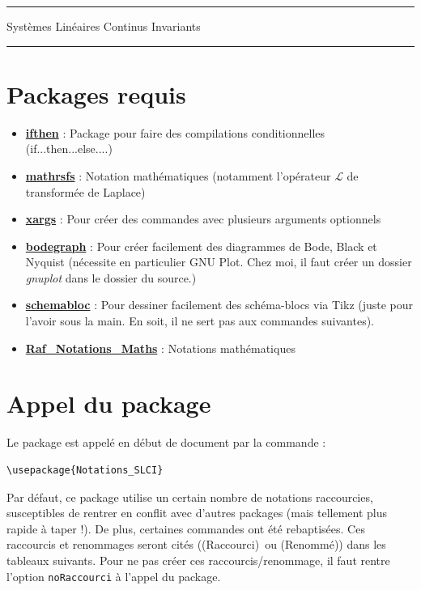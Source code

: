 \documentclass[a4paper,12pt]{article}
\newcommand{\rac}{({\color{red}Raccourci})}
\newcommand{\ren}{({\color{blue}Renommé})}
\begin{document}
	\begin{center}
		\hrule{\Large Systèmes Linéaires Continus Invariants}\\\hrule
	\end{center}


	\section{Packages requis}

		\begin{itemize}
			\item \href{http://www.ctan.org/pkg/ifthen}{\textbf{ifthen}} : Package pour faire des compilations conditionnelles (if...then...else....)
			\item \href{http://www.ctan.org/pkg/mathrsfs}{\textbf{mathrsfs}} : Notation mathématiques (notamment l'opérateur $\mathscr{L}$ de transformée de Laplace)
			\item \href{http://www.ctan.org/pkg/xargs}{\textbf{xargs}} : Pour créer des commandes avec plusieurs arguments optionnels
			\item \href{http://sciences-indus-cpge.papanicola.info/Bode-Black-et-Nyquist-avec-Tikz}{\textbf{bodegraph}} : Pour créer facilement des diagrammes de Bode, Black et Nyquist (nécessite en particulier GNU Plot. Chez moi, il faut créer un dossier \emph{gnuplot} dans le dossier du source.)
			\item \href{http://sciences-indus-cpge.papanicola.info/Schema-blocs-avec-PGF-TIKZ-sous}{\textbf{schemabloc}} : Pour dessiner facilement des schéma-blocs via Tikz (juste pour l'avoir sous la main. En soit, il ne sert pas aux commandes suivantes).
			\item \href{http://enseignement.allais.eu/page-latex}{\textbf{Raf\_Notations\_Maths}} : Notations mathématiques
		\end{itemize}

	\section{Appel du package}

		Le package est appelé en début de document par la commande :
		\begin{verbatim}
\usepackage{Notations_SLCI}
		\end{verbatim}

	Par défaut, ce package utilise un certain nombre de notations raccourcies, susceptibles de rentrer en conflit avec d'autres packages (mais tellement plus rapide à taper !).
	De plus, certaines commandes ont été rebaptisées.
	Ces raccourcis et renommages seront cités (\rac\ ou \ren) dans les tableaux suivants.
	Pour ne pas créer ces raccourcis/renommage, il faut rentre l'option \verb!noRaccourci! à l'appel du package.
\end{document}
